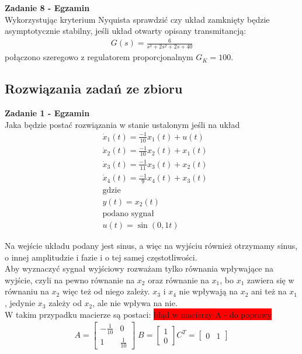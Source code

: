 \documentclass[a4paper,11pt]{article}
\begin{document}
\begin{framed}
\textbf{Zadanie 8 - Egzamin } \\ 
Wykorzystując kryterium Nyquista sprawdzić czy układ zamknięty będzie asymptotycznie stabilny, jeśli układ otwarty opisany transmitancją:
\begin{align*}
G(s)=\frac{6}{s^3+2s^2+2s+40}
\end{align*}
połączono szeregowo z regulatorem proporcjonalnym \( G_K = 100 \). 
\end{framed}


\newpage
\subsection{Rozwiązania zadań ze zbioru}
\begin{framed}
\textbf{Zadanie 1 - Egzamin } \\ 
Jaka będzie postać rozwiązania w stanie ustalonym jeśli na układ  
\begin{align*}
&\dot{x}_{1}(t)=\frac{-1}{10}x_{1}(t)+u(t) \\
&\dot{x}_{2}(t)=\frac{-1}{10}x_{2}(t)+x_{1}(t) \\
&\dot{x}_{3}(t)=\frac{-1}{11}x_{3}(t)+x_{2}(t) \\
&\dot{x}_{4}(t)=\frac{-1}{9}x_{4}(t)+x_{3}(t) \\
&\text{gdzie}\\
&y(t) = x_{2}(t)\\
&\text{podano sygnał} \\
& u(t)=\sin (0,1t)
\end{align*}
\end{framed}
Na wejście układu podany jest sinus, a więc na wyjściu również otrzymamy sinus, o innej amplitudzie i fazie i o tej samej częstotliwości. \\
Aby wyznaczyć sygnał wyjściowy rozważam tylko równania wpływające na wyjście, czyli na pewno równanie na \( x_2 \) oraz równanie na \( x_1 \), bo \( x_1 \) zawiera się w równaniu na \( x_2 \) więc też od niego zależy. \( x_3 \) i \( x_4 \) nie wpływają na \( x_2 \) ani też na \( x_1 \), jedynie \( x_3 \) zależy od \( x_2 \), ale nie wpływa na nie. \\
W takim przypadku macierze są postaci: \colorbox{red}{błąd w macierzy A - do poprawy}
\begin{align*}
A = 
\begin{bmatrix}
-\frac{1}{10} & 0 \\
1 & \frac{1}{10}
\end{bmatrix}
\; 
B = 
\begin{bmatrix}
1 \\
0
\end{bmatrix}
C^T = 
\begin{bmatrix}
0 & 1
\end{bmatrix}
\end{align*}
\end{document}
